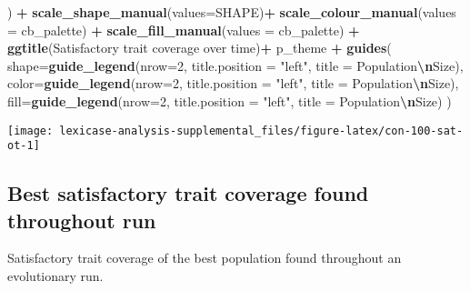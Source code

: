 \documentclass[
]{book}
\newenvironment{Shaded}{\begin{snugshade}}{\end{snugshade}}
\newcommand{\AttributeTok}[1]{\textcolor[rgb]{0.13,0.29,0.53}{#1}}
\newcommand{\DecValTok}[1]{\textcolor[rgb]{0.00,0.00,0.81}{#1}}
\newcommand{\FunctionTok}[1]{\textcolor[rgb]{0.13,0.29,0.53}{\textbf{#1}}}
\newcommand{\NormalTok}[1]{#1}
\newcommand{\SpecialCharTok}[1]{\textcolor[rgb]{0.81,0.36,0.00}{\textbf{#1}}}
\newcommand{\StringTok}[1]{\textcolor[rgb]{0.31,0.60,0.02}{#1}}
\begin{document}
\begin{Shaded}
\begin{Highlighting}[]
\NormalTok{  ) }\SpecialCharTok{+}
  \FunctionTok{scale\_shape\_manual}\NormalTok{(}\AttributeTok{values=}\NormalTok{SHAPE)}\SpecialCharTok{+}
  \FunctionTok{scale\_colour\_manual}\NormalTok{(}\AttributeTok{values =}\NormalTok{ cb\_palette) }\SpecialCharTok{+}
  \FunctionTok{scale\_fill\_manual}\NormalTok{(}\AttributeTok{values =}\NormalTok{ cb\_palette) }\SpecialCharTok{+}
  \FunctionTok{ggtitle}\NormalTok{(}\StringTok{\textquotesingle{}Satisfactory trait coverage over time\textquotesingle{}}\NormalTok{)}\SpecialCharTok{+}
\NormalTok{  p\_theme }\SpecialCharTok{+}
  \FunctionTok{guides}\NormalTok{(}
    \AttributeTok{shape=}\FunctionTok{guide\_legend}\NormalTok{(}\AttributeTok{nrow=}\DecValTok{2}\NormalTok{, }\AttributeTok{title.position =} \StringTok{"left"}\NormalTok{, }\AttributeTok{title =} \StringTok{\textquotesingle{}Population}\SpecialCharTok{\textbackslash{}n}\StringTok{Size\textquotesingle{}}\NormalTok{),}
    \AttributeTok{color=}\FunctionTok{guide\_legend}\NormalTok{(}\AttributeTok{nrow=}\DecValTok{2}\NormalTok{, }\AttributeTok{title.position =} \StringTok{"left"}\NormalTok{, }\AttributeTok{title =} \StringTok{\textquotesingle{}Population}\SpecialCharTok{\textbackslash{}n}\StringTok{Size\textquotesingle{}}\NormalTok{),}
    \AttributeTok{fill=}\FunctionTok{guide\_legend}\NormalTok{(}\AttributeTok{nrow=}\DecValTok{2}\NormalTok{, }\AttributeTok{title.position =} \StringTok{"left"}\NormalTok{, }\AttributeTok{title =} \StringTok{\textquotesingle{}Population}\SpecialCharTok{\textbackslash{}n}\StringTok{Size\textquotesingle{}}\NormalTok{)}
\NormalTok{  )}
\end{Highlighting}
\end{Shaded}

\texttt{[image: lexicase-analysis-supplemental\_files/figure-latex/con-100-sat-ot-1]}

\hypertarget{best-satisfactory-trait-coverage-found-throughout-run-1}{%
\subsection{Best satisfactory trait coverage found throughout run}\label{best-satisfactory-trait-coverage-found-throughout-run-1}}

Satisfactory trait coverage of the best population found throughout an evolutionary run.
\end{document}
